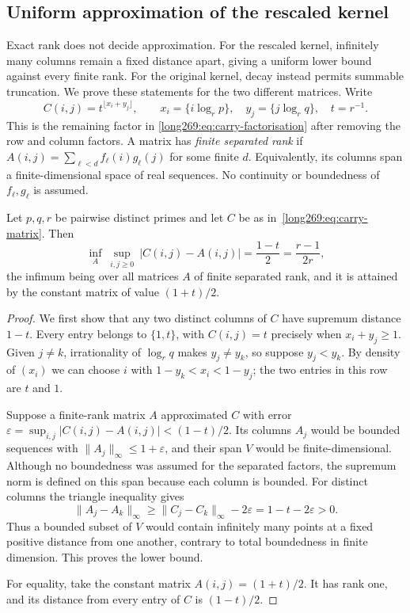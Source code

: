 \subsection{Uniform approximation of the rescaled kernel}\label{long269:sec:approximation}

Exact rank does not decide approximation. For the rescaled kernel,
infinitely many columns remain a fixed distance apart, giving a uniform
lower bound against every finite rank. For the original kernel, decay
instead permits summable truncation. We prove these statements for the
two different matrices. Write
\begin{equation}\label{long269:eq:carry-matrix}
 C(i,j)=t^{\lfloor x_i+y_j\rfloor},\qquad
 x_i=\{i\log_r p\},\quad y_j=\{j\log_r q\},\quad t=r^{-1}.
\end{equation}
This is the remaining factor in
\eqref{long269:eq:carry-factorisation} after removing the row and column
factors. A matrix has \emph{finite separated rank} if
$A(i,j)=\sum_{\ell<d}f_\ell(i)g_\ell(j)$ for some finite $d$.
Equivalently, its columns span a finite-dimensional space of real
sequences. No continuity or boundedness of $f_\ell,g_\ell$ is assumed.

\begin{theorem}\label{long269:res:uniform-rank}
Let $p,q,r$ be pairwise distinct primes and let $C$ be as
in~\eqref{long269:eq:carry-matrix}.  Then
\[
 \inf_{A}\ \sup_{i,j\ge0}\ |C(i,j)-A(i,j)|=\frac{1-t}{2}=\frac{r-1}{2r},
\]
the infimum being over all matrices $A$ of finite separated rank, and it is
attained by the constant matrix of value $(1+t)/2$.
\end{theorem}

\begin{proof}
We first show that any two distinct columns of $C$ have supremum distance
$1-t$. Every entry belongs to $\{1,t\}$, with $C(i,j)=t$ precisely when
$x_i+y_j\ge1$. Given $j\ne k$, irrationality of $\log_r q$ makes
$y_j\ne y_k$, so suppose $y_j<y_k$. By density of $(x_i)$ we can choose
$i$ with $1-y_k<x_i<1-y_j$; the two entries in this row are $t$ and $1$.

Suppose a finite-rank matrix $A$ approximated $C$ with error
$\varepsilon=\sup_{i,j}|C(i,j)-A(i,j)|<(1-t)/2$. Its columns $A_j$ would
be bounded sequences with $\|A_j\|_\infty\le1+\varepsilon$, and their
span $V$ would be finite-dimensional. Although no boundedness was assumed
for the separated factors, the supremum norm is defined on this span
because each column is bounded. For distinct columns the triangle
inequality gives
\[
 \|A_j-A_k\|_\infty\ge\|C_j-C_k\|_\infty-2\varepsilon
 =1-t-2\varepsilon>0.
\]
Thus a bounded subset of $V$ would contain infinitely many points at a
fixed positive distance from one another, contrary to total boundedness
in finite dimension. This proves the lower bound.

For equality, take the constant matrix $A(i,j)=(1+t)/2$. It has rank one,
and its distance from every entry of $C$ is $(1-t)/2$.
\end{proof}

